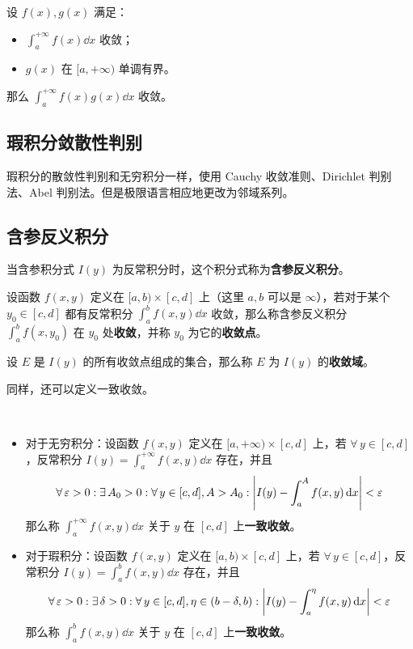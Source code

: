 \begin{theorem}
	设 $f(x), g(x)$ 满足：
	\begin{itemize}
		\item $\displaystyle \int_{a}^{+ \infty} f(x) \dd{x}$ 收敛；
		\item $g(x)$ 在 $[a, + \infty)$ 单调有界。
	\end{itemize}
	那么 $\displaystyle \int_{a}^{+\infty} f(x) g(x) \dd{x}$ 收敛。
\end{theorem}

\subsection{瑕积分敛散性判别}

瑕积分的散敛性判别和无穷积分一样，使用 Cauchy 收敛准则、Dirichlet 判别法、Abel 判别法。但是极限语言相应地更改为邻域系列。

\subsection{含参反义积分}

当含参积分式 $I(y)$ 为反常积分时，这个积分式称为\textbf{含参反义积分}。

\begin{definition}[含参反义积分的逐点收敛]
	设函数 $f(x, y)$ 定义在 $[a, b) \times [c, d]$ 上（这里 $a, b$ 可以是 $\infty$），若对于某个 $y_0 \in [c, d]$ 都有反常积分 $\displaystyle \int_{a}^{b} f(x, y) \dd{x}$ 收敛，那么称含参反义积分 $\displaystyle \int_{a}^{b} f(x, y_0)$ 在 $y_0$ 处\textbf{收敛}，并称 $y_0$ 为它的\textbf{收敛点}。

	设 $E$ 是 $I(y)$ 的所有收敛点组成的集合，那么称 $E$ 为 $I(y)$ 的\textbf{收敛域}。
\end{definition}

同样，还可以定义一致收敛。

\begin{definition}[含参反义积分的一致收敛]
	\ 
	\begin{itemize}
		\item 对于无穷积分：设函数 $f(x, y)$ 定义在 $[a, + \infty) \times [c, d]$ 上，若 $\forall\,y \in [c, d]$，反常积分 $\displaystyle I(y) = \int_{a}^{+ \infty} f(x, y) \dd{x}$ 存在，并且
		$$
		\forall\,\varepsilon > 0: \exists\,A_0 > 0: \forall\,y \in [c, d], A > A_0: \abs{I(y) - \int_{a}^{A} f(x, y) \dd{x}} < \varepsilon
		$$
		那么称 $\displaystyle\int_{a}^{+\infty} f(x, y) \dd{x}$ 关于 $y$ 在 $[c, d]$ 上\textbf{一致收敛}。

		\item 对于瑕积分：设函数 $f(x, y)$ 定义在 $[a, b) \times [c, d]$ 上，若 $\forall\,y \in [c, d]$，反常积分 $\displaystyle I(y) = \int_{a}^{b} f(x, y) \dd{x}$ 存在，并且
		$$
		\forall\,\varepsilon > 0: \exists\,\delta > 0: \forall\,y \in [c, d], \eta \in (b - \delta, b): \abs{I(y) - \int_{a}^{\eta} f(x, y) \dd{x}} < \varepsilon
		$$
		那么称 $\displaystyle\int_{a}^{b} f(x, y) \dd{x}$ 关于 $y$ 在 $[c, d]$ 上\textbf{一致收敛}。
	\end{itemize}
\end{definition}

